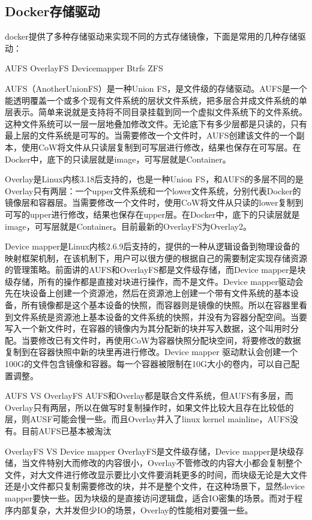\documentclass[../../../interview-questions.tex]{subfiles}
\begin{document}
\subsection{Docker存储驱动}

docker提供了多种存储驱动来实现不同的方式存储镜像，下面是常用的几种存储驱动：

AUFS
OverlayFS
Devicemapper
Btrfs
ZFS

AUFS（AnotherUnionFS）是一种Union FS，是文件级的存储驱动。AUFS是一个能透明覆盖一个或多个现有文件系统的层状文件系统，把多层合并成文件系统的单层表示。简单来说就是支持将不同目录挂载到同一个虚拟文件系统下的文件系统。这种文件系统可以一层一层地叠加修改文件。无论底下有多少层都是只读的，只有最上层的文件系统是可写的。当需要修改一个文件时，AUFS创建该文件的一个副本，使用CoW将文件从只读层复制到可写层进行修改，结果也保存在可写层。在Docker中，底下的只读层就是image，可写层就是Container。


Overlay是Linux内核3.18后支持的，也是一种Union FS，和AUFS的多层不同的是Overlay只有两层：一个upper文件系统和一个lower文件系统，分别代表Docker的镜像层和容器层。当需要修改一个文件时，使用CoW将文件从只读的lower复制到可写的upper进行修改，结果也保存在upper层。在Docker中，底下的只读层就是image，可写层就是Container。目前最新的OverlayFS为Overlay2。

Device mapper是Linux内核2.6.9后支持的，提供的一种从逻辑设备到物理设备的映射框架机制，在该机制下，用户可以很方便的根据自己的需要制定实现存储资源的管理策略。前面讲的AUFS和OverlayFS都是文件级存储，而Device mapper是块级存储，所有的操作都是直接对块进行操作，而不是文件。Device mapper驱动会先在块设备上创建一个资源池，然后在资源池上创建一个带有文件系统的基本设备，所有镜像都是这个基本设备的快照，而容器则是镜像的快照。所以在容器里看到文件系统是资源池上基本设备的文件系统的快照，并没有为容器分配空间。当要写入一个新文件时，在容器的镜像内为其分配新的块并写入数据，这个叫用时分配。当要修改已有文件时，再使用CoW为容器快照分配块空间，将要修改的数据复制到在容器快照中新的块里再进行修改。Device mapper 驱动默认会创建一个100G的文件包含镜像和容器。每一个容器被限制在10G大小的卷内，可以自己配置调整。

AUFS VS OverlayFS
AUFS和Overlay都是联合文件系统，但AUFS有多层，而Overlay只有两层，所以在做写时复制操作时，如果文件比较大且存在比较低的层，则AUSF可能会慢一些。而且Overlay并入了linux kernel mainline，AUFS没有。目前AUFS已基本被淘汰

OverlayFS VS Device mapper
OverlayFS是文件级存储，Device mapper是块级存储，当文件特别大而修改的内容很小，Overlay不管修改的内容大小都会复制整个文件，对大文件进行修改显示要比小文件要消耗更多的时间，而块级无论是大文件还是小文件都只复制需要修改的块，并不是整个文件，在这种场景下，显然device mapper要快一些。因为块级的是直接访问逻辑盘，适合IO密集的场景。而对于程序内部复杂，大并发但少IO的场景，Overlay的性能相对要强一些。
\end{document}
